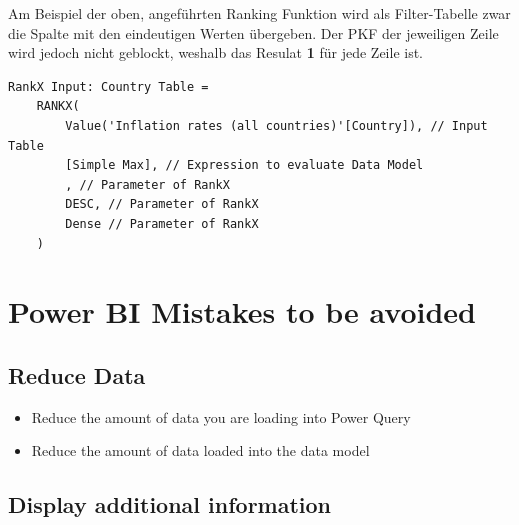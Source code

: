 Am Beispiel der oben, angeführten Ranking Funktion wird als Filter-Tabelle zwar die Spalte mit den eindeutigen Werten übergeben. Der \gls{PKF} der jeweiligen Zeile wird jedoch nicht geblockt, weshalb das Resulat \textbf{1} für jede Zeile ist.

\begin{lstlisting}[style=DAX]
RankX Input: Country Table = 
	RANKX(
		Value('Inflation rates (all countries)'[Country]), // Input Table
		[Simple Max], // Expression to evaluate Data Model
		, // Parameter of RankX
		DESC, // Parameter of RankX
		Dense // Parameter of RankX
	)
\end{lstlisting}

\section{Power BI Mistakes to be avoided}
\subsection{Reduce Data}
\begin{itemize}
	\item Reduce the amount of data you are loading into Power Query
	\item Reduce the amount of data loaded into the data model
\end{itemize}

\subsection{Display additional information}
